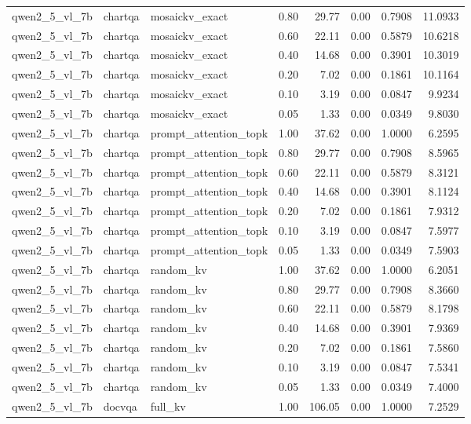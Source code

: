 \begin{longtable}{lllrrrrr}
qwen2\_5\_vl\_7b & chartqa & mosaickv\_exact & 0.80 & 29.77 & 0.00 & 0.7908 & 11.0933 \\
qwen2\_5\_vl\_7b & chartqa & mosaickv\_exact & 0.60 & 22.11 & 0.00 & 0.5879 & 10.6218 \\
qwen2\_5\_vl\_7b & chartqa & mosaickv\_exact & 0.40 & 14.68 & 0.00 & 0.3901 & 10.3019 \\
qwen2\_5\_vl\_7b & chartqa & mosaickv\_exact & 0.20 & 7.02 & 0.00 & 0.1861 & 10.1164 \\
qwen2\_5\_vl\_7b & chartqa & mosaickv\_exact & 0.10 & 3.19 & 0.00 & 0.0847 & 9.9234 \\
qwen2\_5\_vl\_7b & chartqa & mosaickv\_exact & 0.05 & 1.33 & 0.00 & 0.0349 & 9.8030 \\
qwen2\_5\_vl\_7b & chartqa & prompt\_attention\_topk & 1.00 & 37.62 & 0.00 & 1.0000 & 6.2595 \\
qwen2\_5\_vl\_7b & chartqa & prompt\_attention\_topk & 0.80 & 29.77 & 0.00 & 0.7908 & 8.5965 \\
qwen2\_5\_vl\_7b & chartqa & prompt\_attention\_topk & 0.60 & 22.11 & 0.00 & 0.5879 & 8.3121 \\
qwen2\_5\_vl\_7b & chartqa & prompt\_attention\_topk & 0.40 & 14.68 & 0.00 & 0.3901 & 8.1124 \\
qwen2\_5\_vl\_7b & chartqa & prompt\_attention\_topk & 0.20 & 7.02 & 0.00 & 0.1861 & 7.9312 \\
qwen2\_5\_vl\_7b & chartqa & prompt\_attention\_topk & 0.10 & 3.19 & 0.00 & 0.0847 & 7.5977 \\
qwen2\_5\_vl\_7b & chartqa & prompt\_attention\_topk & 0.05 & 1.33 & 0.00 & 0.0349 & 7.5903 \\
qwen2\_5\_vl\_7b & chartqa & random\_kv & 1.00 & 37.62 & 0.00 & 1.0000 & 6.2051 \\
qwen2\_5\_vl\_7b & chartqa & random\_kv & 0.80 & 29.77 & 0.00 & 0.7908 & 8.3660 \\
qwen2\_5\_vl\_7b & chartqa & random\_kv & 0.60 & 22.11 & 0.00 & 0.5879 & 8.1798 \\
qwen2\_5\_vl\_7b & chartqa & random\_kv & 0.40 & 14.68 & 0.00 & 0.3901 & 7.9369 \\
qwen2\_5\_vl\_7b & chartqa & random\_kv & 0.20 & 7.02 & 0.00 & 0.1861 & 7.5860 \\
qwen2\_5\_vl\_7b & chartqa & random\_kv & 0.10 & 3.19 & 0.00 & 0.0847 & 7.5341 \\
qwen2\_5\_vl\_7b & chartqa & random\_kv & 0.05 & 1.33 & 0.00 & 0.0349 & 7.4000 \\
qwen2\_5\_vl\_7b & docvqa & full\_kv & 1.00 & 106.05 & 0.00 & 1.0000 & 7.2529 \\

\end{longtable}
